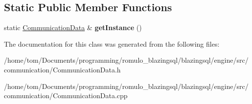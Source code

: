 \subsection*{Static Public Member Functions}
\begin{DoxyCompactItemize}
\item 
\mbox{\label{classral_1_1communication_1_1CommunicationData_a5924a72dfc16fa5078ff30e9d7289e94}} 
static \hyperlink{classral_1_1communication_1_1CommunicationData}{Communication\+Data} \& {\bfseries get\+Instance} ()
\end{DoxyCompactItemize}


The documentation for this class was generated from the following files\+:\begin{DoxyCompactItemize}
\item 
/home/tom/\+Documents/programming/romulo\+\_\+blazingsql/blazingsql/engine/src/communication/Communication\+Data.\+h\item 
/home/tom/\+Documents/programming/romulo\+\_\+blazingsql/blazingsql/engine/src/communication/Communication\+Data.\+cpp\end{DoxyCompactItemize}
